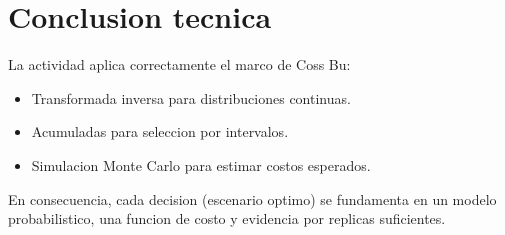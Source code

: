 \documentclass[12pt,a4paper]{article}
\begin{document}
\section{Conclusion tecnica}
La actividad aplica correctamente el marco de Coss Bu:
\begin{itemize}
  \item Transformada inversa para distribuciones continuas.
  \item Acumuladas para seleccion por intervalos.
  \item Simulacion Monte Carlo para estimar costos esperados.
\end{itemize}
En consecuencia, cada decision (escenario optimo) se fundamenta en un modelo probabilistico, una funcion de costo y evidencia por replicas suficientes.
\end{document}

